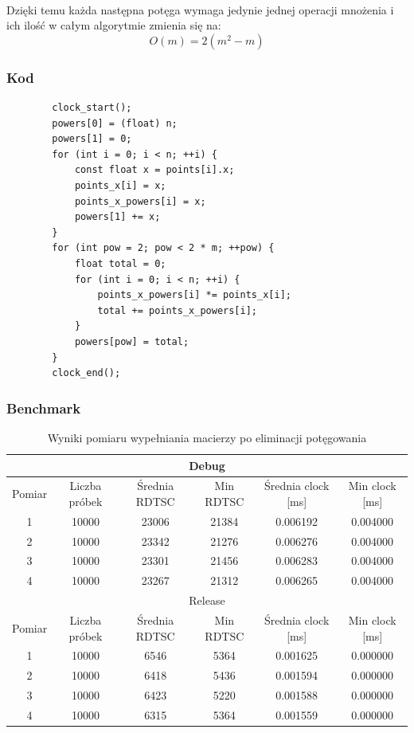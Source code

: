 \documentclass[12pt]{report}
\begin{document}
	\paragraph{}
	Dzięki temu każda następna potęga wymaga jedynie jednej operacji mnożenia i ich ilość w całym algorytmie zmienia się na:
	\begin{equation}
		O(m) = 2(m^2 - m)
	\end{equation}
	
	\subsubsection{Kod}
	\begin{verbatim}
		clock_start();
		powers[0] = (float) n;
		powers[1] = 0;
		for (int i = 0; i < n; ++i) {
			const float x = points[i].x;
			points_x[i] = x;
			points_x_powers[i] = x;
			powers[1] += x;
		}
		for (int pow = 2; pow < 2 * m; ++pow) {
			float total = 0;
			for (int i = 0; i < n; ++i) {
				points_x_powers[i] *= points_x[i];
				total += points_x_powers[i];
			}
			powers[pow] = total;
		}
		clock_end();
	\end{verbatim}
	
	\subsubsection{Benchmark}
	\begin{table}[H]
		\centering
		\caption{Wyniki pomiaru wypełniania macierzy po eliminacji potęgowania}
		\begin{tabular}{|c|c|c|c|c|c|} \hline
			\multicolumn{6}{|c|}{Debug} \\\hline
			Pomiar  & Liczba próbek & Średnia RDTSC & Min RDTSC & Średnia clock [ms] & Min clock [ms] \\\hline
			1 & 10000 & 23006 & 21384 & 0.006192 & 0.004000 \\\hline
			2 & 10000 & 23342 & 21276 & 0.006276 & 0.004000 \\\hline
			3 & 10000 & 23301 & 21456 & 0.006283 & 0.004000 \\\hline
			4 & 10000 & 23267 & 21312 & 0.006265 & 0.004000 \\\hline
			\hline
			\multicolumn{6}{|c|}{Release} \\\hline
			Pomiar  & Liczba próbek & Średnia RDTSC & Min RDTSC & Średnia clock [ms] & Min clock [ms] \\\hline
			1 & 10000 & 6546 & 5364 & 0.001625 & 0.000000 \\\hline
			2 & 10000 & 6418 & 5436 & 0.001594 & 0.000000 \\\hline
			3 & 10000 & 6423 & 5220 & 0.001588 & 0.000000 \\\hline
			4 & 10000 & 6315 & 5364 & 0.001559 & 0.000000 \\\hline
		\end{tabular}
	\end{table}
	
\end{document}
